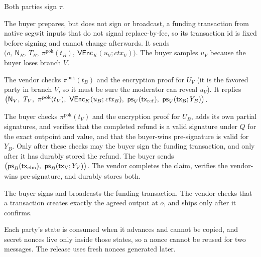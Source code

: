 \begin{description}[leftmargin=1.2em]
  \item[Round 0.] Both parties sign $\tau$.
  \item[Round 1, buyer $\to$ vendor.] The buyer prepares, but does not sign or broadcast, a funding transaction from native segwit inputs that do not signal replace-by-fee, so its transaction id is fixed before signing and cannot change afterwards. It sends
  $\bigl(o,\ \mathsf{N}_B,\ T_B,\ \pi^{\mathrm{pok}}(t_B),\ \mathsf{VEnc}_K(u_V;\mathit{ctx}_V)\bigr)$.
  The buyer samples $u_V$ because the buyer loses branch $V$.
  \item[Round 2, vendor $\to$ buyer.] The vendor checks $\pi^{\mathrm{pok}}(t_B)$ and the encryption proof for $U_V$ (it is the favored party in branch $V$, so it must be sure the moderator can reveal $u_V$). It replies
  $\bigl(\mathsf{N}_V,\ T_V,\ \pi^{\mathrm{pok}}(t_V),\ \mathsf{VEnc}_K(u_B;\mathit{ctx}_B),\ \mathsf{ps}_V(\tx{ref}),\ \mathsf{ps}_V(\tx{B};Y_B)\bigr)$.
  \item[Round 3, buyer $\to$ vendor.] The buyer checks $\pi^{\mathrm{pok}}(t_V)$ and the encryption proof for $U_B$, adds its own partial signatures, and verifies that the completed refund is a valid signature under $Q$ for the exact outpoint and value, and that the buyer-wins pre-signature is valid for $Y_B$. Only after these checks may the buyer sign the funding transaction, and only after it has durably stored the refund. The buyer sends
  $\bigl(\mathsf{ps}_B(\tx{clm}),\ \mathsf{ps}_B(\tx{V};Y_V)\bigr)$.
  The vendor completes the claim, verifies the vendor-wins pre-signature, and durably stores both.
  \item[Funding.] The buyer signs and broadcasts the funding transaction. The vendor checks that a transaction creates exactly the agreed output at $o$, and ships only after it confirms.
\end{description}

Each party's state is consumed when it advances and cannot be copied, and secret nonces live only inside those states, so a nonce cannot be reused for two messages. The release uses fresh nonces generated later.

